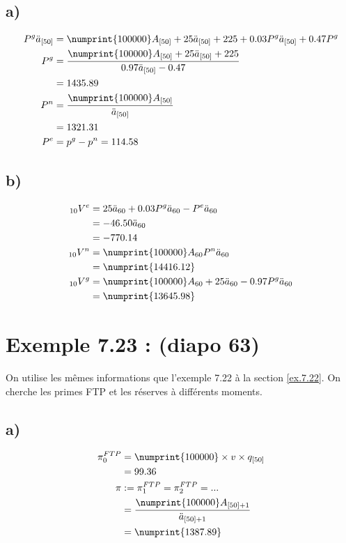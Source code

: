 \documentclass[11pt,french]{report}
\newcommand{\indiceGauche}[2]{{\vphantom{#2}}_{#1}#2}
\begin{document}
\subsection*{a)}
\begin{align*}
P^g \ddot{a}_{[50]} &= \numprint{100000} A_{[50]} + 25 \ddot{a}_{[50]} + 225 + 0.03P^g\ddot{a}_{[50]} + 0.47 P^g \\
P^g&= \frac{\numprint{100000} A_{[50]} + 25 \ddot{a}_{[50]} + 225}{0.97\ddot{a}_{[50]} -0.47} \\
&=1435.89 \\
P^n&= \frac{\numprint{100000} A_{[50]}}{\ddot{a}_{[50]}} \\
&=1321.31 \\
P^e &= p^g - p^n = 114.58
\end{align*} 

\subsection*{b)}
\begin{align*}
\indiceGauche{10}{V}^e &= 25\ddot{a}_{60} + 0.03P^g \ddot{a}_{60} - P^e \ddot{a}_{60}\\
&= -46.50 \ddot{a}_{60} \\
&=-770.14 \\
\indiceGauche{10}{V}^n &= \numprint{100000}A_{60}P^n \ddot{a}_{60}\\
&=\numprint{14416.12} \\
\indiceGauche{10}{V}^g &= \numprint{100000}A_{60} + 25\ddot{a}_{60} -0.97P^g \ddot{a}_{60} \\
&=\numprint{13645.98} \\
\end{align*} 

\section{Exemple 7.23 : (diapo 63)}
On utilise les mêmes informations que l'exemple 7.22 à la section \ref{ex.7.22}.
On cherche les primes FTP et les réserves à différents moments.
\subsection*{a)}
\begin{align*}
\pi_0^{FTP} &= \numprint{100000}\times v \times q_{[50]} \\
&= 99.36 \\
\pi &:= \pi_1^{FTP} = \pi_2^{FTP} =... \\
&= \frac{\numprint{100000} A_{[50]+1}}{\ddot{a}_{[50]+1}} \\
&= \numprint{1387.89}
\end{align*}
\end{document}
